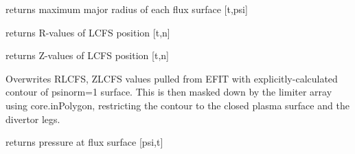 \documentclass[letterpaper,10pt,english]{sphinxmanual}
\begin{document}
\begin{fulllineitems}
\begin{fulllineitems}
\end{fulllineitems}


\begin{fulllineitems}
\label{eqtools:eqtools.EFIT.EFITTree.getRmidPsi}
returns maximum major radius of each flux surface {[}t,psi{]}

\end{fulllineitems}


\begin{fulllineitems}
\label{eqtools:eqtools.EFIT.EFITTree.getRLCFS}
returns R-values of LCFS position {[}t,n{]}

\end{fulllineitems}


\begin{fulllineitems}
\label{eqtools:eqtools.EFIT.EFITTree.getZLCFS}
returns Z-values of LCFS position {[}t,n{]}

\end{fulllineitems}


\begin{fulllineitems}
\label{eqtools:eqtools.EFIT.EFITTree.remapLCFS}
Overwrites RLCFS, ZLCFS values pulled from EFIT with explicitly-calculated contour
of psinorm=1 surface.  This is then masked down by the limiter array using core.inPolygon,
restricting the contour to the closed plasma surface and the divertor legs.

\end{fulllineitems}


\begin{fulllineitems}
\label{eqtools:eqtools.EFIT.EFITTree.getFluxPres}
returns pressure at flux surface {[}psi,t{]}

\end{fulllineitems}


\end{fulllineitems}
\end{document}
